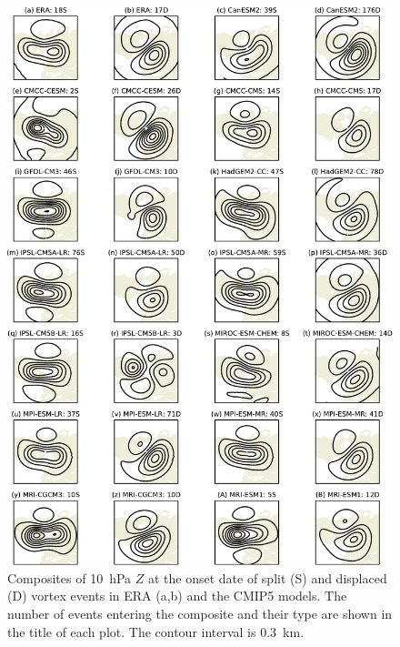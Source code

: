 \begin{figure}
 \centering
 \noindent\includegraphics[width=\textwidth]{figures/chapter-models/10hPa_GPH_composites.pdf}
 \caption[Composites of 10~hPa $Z$ at the onset date split and displaced vortex
 events in the CMIP5 models.]{Composites of 10~hPa $Z$ at the onset date of
   split (S) and displaced (D) vortex events in ERA (a,b) and the CMIP5
   models. The number of events entering the composite and their type are
   shown in the title of each plot. The contour interval is 0.3~km.}
 \label{Fig2}
\end{figure}

